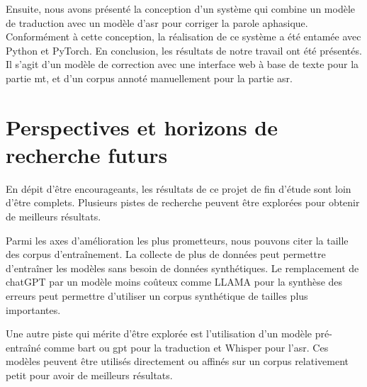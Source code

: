 Ensuite, nous avons présenté la conception d'un système 
qui combine un modèle de traduction avec un modèle d'\gls{asr} pour corriger la parole aphasique.
Conformément à cette conception, la réalisation de ce système a été entamée avec Python et PyTorch.
En conclusion, les résultats de notre travail ont été présentés.
Il s'agit d'un modèle de correction avec une interface web à base de texte pour la partie \gls{mt},
et d'un corpus annoté manuellement pour la partie \gls{asr}.

\section*{Perspectives et horizons de recherche futurs}

En dépit d'être encourageants, les résultats de ce projet de fin d'étude sont loin d'être complets.
Plusieurs pistes de recherche peuvent être explorées pour obtenir de meilleurs résultats.

Parmi les axes d'amélioration les plus prometteurs, nous pouvons citer la taille des corpus d'entraînement.
La collecte de plus de données peut permettre d'entraîner les modèles sans besoin de données synthétiques.
Le remplacement de chatGPT par un modèle moins coûteux comme LLAMA pour la synthèse des erreurs
peut permettre d'utiliser un corpus synthétique de tailles plus importantes.

Une autre piste qui mérite d'être explorée est l'utilisation d'un modèle pré-entraîné comme \gls{bart} ou \gls{gpt}
pour la traduction et Whisper pour l'\gls{asr}.
Ces modèles peuvent être utilisés directement 
ou affinés sur un corpus relativement petit pour avoir de meilleurs résultats. 

